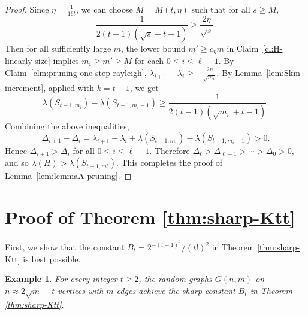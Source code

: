 \documentclass[11pt]{article}
\newtheorem{example}[theorem]{Example}
\theoremstyle{definition}
\theoremstyle{plain}
\begin{document}
\begin{proof}
Since $\eta= \frac{1}{16t}$, we can choose $M=M(t,\eta)$ such that for all \(s\ge M\),
\[
\frac{1}{2(t-1)(\sqrt s+t-1)} > \frac{2\eta}{\sqrt s}.
\]
Then for all sufficiently large $m$, the lower bound $m'\ge c_\eta m$ in Claim~\ref{cl:H-linearly-size} implies $m_i\ge m'\ge M$ for each $0\le i\le \ell-1$. 
By Claim~\ref{clm:pruning-one-step-rayleigh}, $\lambda_{i+1} - \lambda_i \ge -\frac{2\eta}{\sqrt{m_i}}.$
By Lemma~\ref{lem:Skm-increment}, applied with \(k=t-1\), we get
\[
  \lambda(S_{t-1,m_i})-
  \lambda(S_{t-1,m_i-1})
  \ge
  \frac{1}{2(t-1)(\sqrt{m_i}+t-1)}.
\]
Combining the above inequalities,
\[
  \Delta_{i+1} - \Delta_i
  =
  \lambda_{i+1} - \lambda_i
  +
  \lambda(S_{t-1,m_i})
  -
  \lambda(S_{t-1,m_i-1})
  >0.
\]
Hence $\Delta_{i+1}> \Delta_i$ for all \(0\le i\le \ell-1\). Therefore $\Delta_\ell>\Delta_{\ell-1}>\cdots>\Delta_0>0,$
and so $\lambda(H)>\lambda(S_{t-1,m'}).$
This completes the proof of Lemma~\ref{lem:lemmaA-pruning}.
\end{proof}



\section{Proof of Theorem \ref{thm:sharp-Ktt}} 

\label{sec-four-key-lemmas}

First, we show that the constant $B_t= 2^{-(t-1)^2}/(t!)^2$ in Theorem \ref{thm:sharp-Ktt} is best possible. 

\begin{example} \label{exam:sharpness-Bt}
For every integer $t\ge 2$, 
   the random graphs $G(n,m)$ on $n\approx 2\sqrt{m} - t$ vertices with $m$ edges achieve the sharp constant $B_t$ in Theorem \ref{thm:sharp-Ktt}. 
\end{example}
\end{document}
